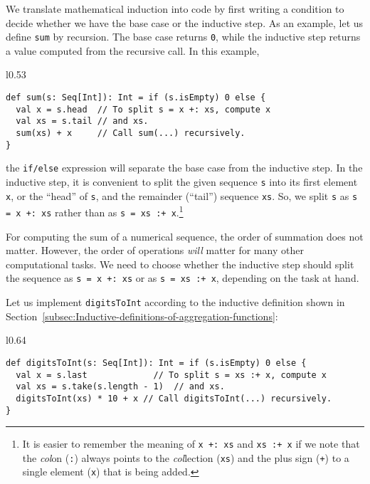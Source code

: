 We translate mathematical induction into code by first writing a condition
to decide whether we have the base case or the inductive step. As
an example, let us define \lstinline!sum! by recursion. The base
case returns \lstinline!0!, while the inductive step returns a value
computed from the recursive call. In this example, 

\begin{wrapfigure}{l}{0.53\columnwidth}%
\vspace{-0.85\baselineskip}
\begin{lstlisting}
def sum(s: Seq[Int]): Int = if (s.isEmpty) 0 else {
  val x = s.head  // To split s = x +: xs, compute x
  val xs = s.tail // and xs.
  sum(xs) + x     // Call sum(...) recursively.
}
\end{lstlisting}

\vspace{-1.5\baselineskip}
\end{wrapfigure}%

\noindent the \lstinline!if/else! expression will separate the base
case from the inductive step. In the inductive step, it is convenient
to split the given sequence \lstinline!s! into its first element
\lstinline!x!, or the \textsf{``}head\textsf{''} of \lstinline!s!, and the remainder
(\textsf{``}tail\textsf{''}) sequence \lstinline!xs!. So, we split \lstinline!s!
as \lstinline!s = x +: xs! rather than as \lstinline!s = xs :+ x!.\footnote{It is easier to remember the meaning of \lstinline!x +: xs! and \lstinline!xs :+ x!
if we note that the \emph{col}on (\lstinline!:!) always points to
the \emph{col}lection (\lstinline!xs!) and the plus sign (\lstinline!+!)
to a single element (\lstinline!x!) that is being added.}

For computing the sum of a numerical sequence, the order of summation
does not matter. However, the order of operations \emph{will} matter
for many other computational tasks. We need to choose whether the
inductive step should split the sequence as \lstinline!s = x +: xs!
or as \lstinline!s = xs :+ x!, depending on the task at hand.

Let us implement \lstinline!digitsToInt! according to the inductive
definition shown in Section~\ref{subsec:Inductive-definitions-of-aggregation-functions}:

\begin{wrapfigure}{l}{0.64\columnwidth}%
\vspace{-0.85\baselineskip}
\begin{lstlisting}
def digitsToInt(s: Seq[Int]): Int = if (s.isEmpty) 0 else {
  val x = s.last             // To split s = xs :+ x, compute x
  val xs = s.take(s.length - 1)  // and xs.
  digitsToInt(xs) * 10 + x // Call digitsToInt(...) recursively.
}
\end{lstlisting}

\vspace{-1.5\baselineskip}
\end{wrapfigure}%

